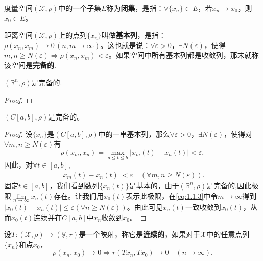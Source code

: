 \documentclass[../../main.tex]{subfiles}
\begin{document}
\begin{definition}
度量空间$(\mathscr{X},\rho)$中的一个子集$E$称为\textbf{闭集}，是指：$\forall \{x_n\} \subset E$，若$x_n \to x_0$，则$x_0 \in E$。
\end{definition}

\begin{definition}
距离空间$(\mathscr{X},\rho)$上的点列$\{x_n\}$叫做\textbf{基本列}，是指：$\rho(x_n,x_m) \to 0\,(n,m \to \infty)$。这也就是说：$\forall \varepsilon > 0$，$\exists N(\varepsilon)$，使得$m,n \geqslant N(\varepsilon) \Rightarrow \rho(x_n,x_m) < \varepsilon$。如果空间中所有基本列都是收敛列，那末就称该空间是\textbf{完备的}.
\end{definition}

\begin{example}
$(\mathbb{R}^n,\rho)$是完备的.
\end{example}
\begin{proof}

\end{proof}

\begin{example}
$(C[a,b],\rho)$是完备的。
\end{example}
\begin{proof}
设$\{x_n\}$是$(C[a,b],\rho)$中的一串基本列，那么$\forall \varepsilon>0$，$\exists N(\varepsilon)$，使得对$\forall m,n\geqslant N(\varepsilon)$有
$$\rho(x_m,x_n)=\max_{a\leqslant t\leqslant b}|x_m(t)-x_n(t)|<\varepsilon,$$
因此，对$\forall t\in [a,b]$,
\begin{align}
\label{eq:1.1.3}
|x_m(t)-x_n(t)|<\varepsilon \quad (\forall m,n\geqslant N(\varepsilon)).
\end{align}
固定$t\in [a,b]$，我们看到数列$\{x_n(t)\}$是基本的，由于$(\mathbb{R}^n,\rho)$是完备的,因此极限$\lim\limits_{n\to \infty} x_n(t)$存在。让我们用$x_0(t)$表示此极限，在\eqref{eq:1.1.3}中令$m\to \infty$得到$|x_0(t)-x_n(t)|\leqslant \varepsilon (\forall n\geqslant N(\varepsilon))$。由此可见$x_n(t)$一致收敛到$x_0(t)$，从而$x_0(t)$连续并在$C[a,b]$中$x_n$收敛到$x_0$。
\end{proof}

\begin{definition}
设$T: (\mathscr{X}, \rho) \to (\mathscr{Y}, r)$是一个映射，称它是\textbf{连续的}，如果对于$\mathscr{X}$中的任意点列$\{x_n\}$和点$x_0$，
$$\rho(x_n, x_0) \to 0 \Rightarrow r(Tx_n, Tx_0) \to 0 \quad (n \to \infty).$$
\end{definition}
\end{document}
